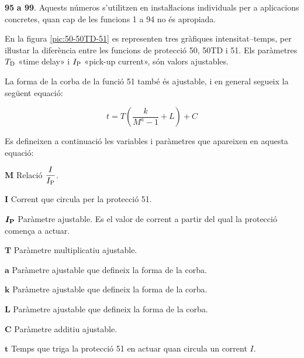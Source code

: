 \begin{multicols}{2}
\begin{list}{}
\item[\textbf{95}] \textbf{a 99}. Aquests números s'utilitzen en instaŀlacions
individuals per a aplicacions concretes, quan cap de les funcions 1
a 94 no és apropiada.

\end{list}
\end{multicols}

En la figura \vref{pic:50-50TD-51} es representen tres gràfiques intensitat--temps, per iŀlustar la diferència entre les funcions de protecció 50, 50TD i 51. Els paràmetres $T_\mathrm{D}$ «time delay» i $I_\mathrm{P}$ «pick-up current», són valors ajustables.
\begin{center}
    
    \label{pic:50-50TD-51}
\end{center}

La forma de la corba de la funció 51 també és ajustable, i en general segueix la següent equació:

\begin{equation}
  t = T \left( \frac{k}{M^a -1} + L \right) + C
\end{equation}

Es defineixen a continuació les variables i paràmetres que apareixen en aquesta equació:
\begin{list}{}
   {\setlength{\labelwidth}{10mm} \setlength{\leftmargin}{10mm} \setlength{\labelsep}{2mm}}
        \item[$\boldsymbol{M}$] Relació $\dfrac{I}{I_\mathrm{P}}$.
        \item[$\boldsymbol{I}$] Corrent que circula per la protecció 51.
        \item[$\boldsymbol{I_\mathrm{P}}$] Paràmetre ajustable. Es el valor de corrent a partir del qual la  protecció comença a actuar.
        \item[$\boldsymbol{T}$] Paràmetre multiplicatiu ajustable.
        \item[$\boldsymbol{a}$] Paràmetre ajustable que defineix la forma de la corba.
        \item[$\boldsymbol{k}$] Paràmetre ajustable que defineix la forma de la corba.
        \item[$\boldsymbol{L}$] Paràmetre ajustable que defineix la forma de la corba.
        \item[$\boldsymbol{C}$] Paràmetre additiu ajustable.
        \item[$\boldsymbol{t}$] Temps que triga la protecció 51 en actuar quan circula un corrent $I$.
\end{list}

